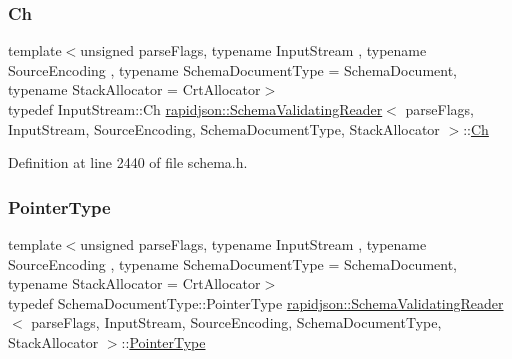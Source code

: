 \subsubsection{\texorpdfstring{Ch}{Ch}}
{\footnotesize\ttfamily template$<$unsigned parse\+Flags, typename Input\+Stream , typename Source\+Encoding , typename Schema\+Document\+Type  = Schema\+Document, typename Stack\+Allocator  = Crt\+Allocator$>$ \\
typedef Input\+Stream\+::\+Ch \mbox{\hyperlink{classrapidjson_1_1_schema_validating_reader}{rapidjson\+::\+Schema\+Validating\+Reader}}$<$ parse\+Flags, Input\+Stream, Source\+Encoding, Schema\+Document\+Type, Stack\+Allocator $>$\+::\mbox{\hyperlink{classrapidjson_1_1_schema_validating_reader_a3507a4886ce6778fe1cae39ed5f0baaf}{Ch}}}



Definition at line 2440 of file schema.\+h.

\mbox{\label{classrapidjson_1_1_schema_validating_reader_a42c64d1ed25ffb2e70a35b9e43e0e564}} 
\subsubsection{\texorpdfstring{PointerType}{PointerType}}
{\footnotesize\ttfamily template$<$unsigned parse\+Flags, typename Input\+Stream , typename Source\+Encoding , typename Schema\+Document\+Type  = Schema\+Document, typename Stack\+Allocator  = Crt\+Allocator$>$ \\
typedef Schema\+Document\+Type\+::\+Pointer\+Type \mbox{\hyperlink{classrapidjson_1_1_schema_validating_reader}{rapidjson\+::\+Schema\+Validating\+Reader}}$<$ parse\+Flags, Input\+Stream, Source\+Encoding, Schema\+Document\+Type, Stack\+Allocator $>$\+::\mbox{\hyperlink{classrapidjson_1_1_schema_validating_reader_a42c64d1ed25ffb2e70a35b9e43e0e564}{Pointer\+Type}}}



